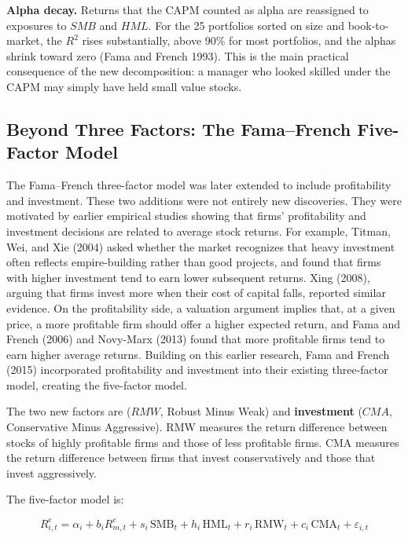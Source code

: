 \textbf{Alpha decay.} Returns that the CAPM counted as alpha are reassigned to exposures to $SMB$ and $HML$. For the 25 portfolios sorted on size and book-to-market, the $R^2$ rises substantially, above 90\% for most portfolios, and the alphas shrink toward zero (Fama and French 1993). This  is the main practical consequence of the new decomposition: a manager who looked skilled under the CAPM may simply have held small value stocks.

\subsection{Beyond Three Factors: The Fama--French Five-Factor Model}
\label{sec:04-multifactor}

The Fama--French three-factor model was later extended to include profitability and investment. These two additions were not entirely new
discoveries. They were motivated by earlier empirical studies showing that firms' profitability and investment decisions are related to
average stock returns. For example, Titman, Wei, and Xie (2004) asked whether the market recognizes that heavy investment often reflects empire-building rather than
good projects, and found that firms with higher investment tend to earn lower subsequent returns. Xing (2008), arguing that firms invest more
when their cost of capital falls, reported similar evidence. On the profitability side, a valuation argument implies that, at a given price, a more
profitable firm should offer a higher expected return, and Fama and French (2006) and Novy-Marx (2013) found that more
profitable firms tend to earn higher average returns. Building on this earlier research, Fama and French (2015) incorporated profitability
and investment into their existing three-factor model, creating the five-factor model.

The two new factors are   ($RMW$, Robust Minus Weak) and
\textbf{investment} ($CMA$, Conservative Minus Aggressive). RMW measures the return difference between stocks of
highly profitable firms and those of less profitable firms. CMA measures the return difference between firms that invest conservatively
and those that invest aggressively. 

The five-factor model is:

\begin{equation}
  R^{e}_{i,t} = \alpha_i + b_i R^{e}_{m,t} + s_i \,\mathrm{SMB}_t + h_i \,\mathrm{HML}_t + r_i \,\mathrm{RMW}_t + c_i \,\mathrm{CMA}_t + \varepsilon_{i,t}
  \label{eq:04-ff5}
\end{equation}

